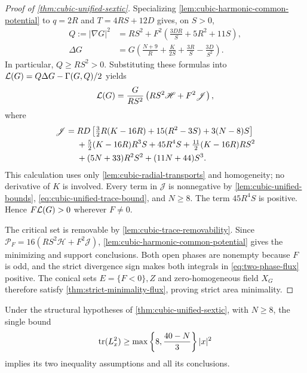 \begin{proof}[Proof of \cref{thm:cubic-unified-sextic}]
Specializing \cref{lem:cubic-harmonic-common-potential} to
\(q=2R\) and \(T=4RS+12D\) gives, on \(S>0\),
\begin{align}
 Q:=|\nabla G|^2
 &=RS^2+F^2\left(\frac{3DR}{S}+5R^2+11S\right),
 \label{eq:cubic-unified-gradient}\\
 \Delta G
 &=G\left(\frac{N+9}{R}+\frac{K}{2S}
                     +\frac{3R}{S}-\frac{3D}{S^2}\right).
 \label{eq:cubic-unified-laplacian}
\end{align}
In particular, \(Q\ge RS^2>0\). Substituting these formulas into
\(\mathcal L(G)=Q\Delta G-\Gamma(G,Q)/2\) yields
\begin{equation}\label{eq:cubic-unified-defect}
 \mathcal L(G)=\frac{G}{RS^2}
             \left(RS^2\mathscr H+F^2\mathscr J\right),
\end{equation}
where
\begin{align}
 \mathscr J={}&RD\left[\tfrac32R(K-16R)
                  +15(R^2-3S)+3(N-8)S\right]\notag\\
 &+\tfrac52(K-16R)R^3S+45R^4S
             +\tfrac{11}{2}(K-16R)RS^2\notag\\
 &+(5N+33)R^2S^2+(11N+44)S^3.
 \label{eq:cubic-unified-J}
\end{align}
This calculation uses only \cref{lem:cubic-radial-transports} and
homogeneity; no derivative of \(K\) is involved. Every term in \(\mathscr J\)
is nonnegative by \cref{lem:cubic-unified-bounds},
\eqref{eq:cubic-unified-trace-bound}, and \(N\ge8\). The term
\(45R^4S\) is positive. Hence \(F\mathcal L(G)>0\) wherever \(F\ne0\).

The critical set is removable by \cref{lem:cubic-trace-removability}.
Since \(\mathcal P_F=16(RS^2\mathscr H+F^2\mathscr J)\),
\cref{lem:cubic-harmonic-common-potential} gives the minimizing
and support conclusions.
Both open phases are nonempty because \(F\) is odd, and the strict
divergence sign makes both integrals in \eqref{eq:two-phase-flux}
positive. The conical sets \(E=\{F<0\},Z\) and zero-homogeneous field \(X_G\)
therefore satisfy \cref{thm:strict-minimality-flux}, proving strict
area minimality.
\end{proof}

\begin{corollary}
\label{cor:cubic-unified-trace}
Under the structural hypotheses of \cref{thm:cubic-unified-sextic},
with \(N\ge8\), the single bound
\begin{equation}\label{eq:cubic-unified-simple-trace}
 \operatorname{tr}(L_x^2)\ge
       \max\left\{8,\frac{40-N}{3}\right\}|x|^2
\end{equation}
implies its two inequality assumptions and all its conclusions.
\end{corollary}

